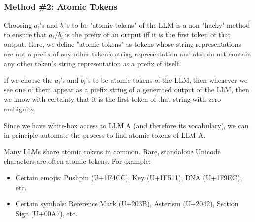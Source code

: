 \documentclass{article}
\begin{document}
\subsubsection{Method \#2: Atomic Tokens}

Choosing $\displaystyle a_{i}$'s and $\displaystyle b_{i}$'s to be "atomic tokens" of the LLM is a non-"hacky" method to ensure that $\displaystyle a_{i}$/$\displaystyle b_{i}$ is the prefix of an output iff it is the first token of that output. Here, we define "atomic tokens" as tokens whose string representations are not a prefix of any other token's string representation and also do not contain any other token's string representation as a prefix of itself.



If we choose the $\displaystyle a_{i}$'s and $\displaystyle b_{i}$'s to be atomic tokens of the LLM, then whenever we see one of them appear as a prefix string of a generated output of the LLM, then we know with certainty that it is the first token of that string with zero ambiguity.



Since we have white-box access to LLM A (and therefore its vocabulary), we can in principle automate the process to find atomic tokens of LLM A.



Many LLMs share atomic tokens in common. Rare, standalone Unicode characters are often atomic tokens. For example:
\begin{itemize}
\item Certain emojis: Pushpin (U+1F4CC), Key (U+1F511), DNA (U+1F9EC), etc.
\item Certain symbols: Reference Mark (U+203B), Asterism (U+2042), Section Sign (U+00A7), etc.
\end{itemize}
\end{document}
